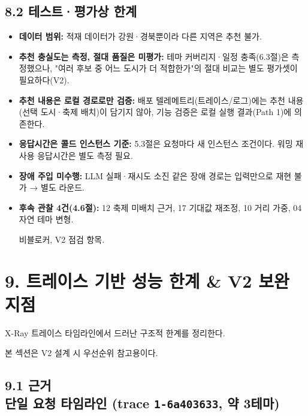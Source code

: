 \documentclass[12pt,a4paper]{article}
\newcommand{\DocNeedspace}[1]{\par\ifdim\dimexpr\pagegoal-\pagetotal\relax<#1\newpage\fi}
\providecommand{\tightlist}{\setlength{\itemsep}{0pt}\setlength{\parskip}{0pt}}
\begin{document}
\DocNeedspace{6\baselineskip}
\subsection*{8.2 테스트·평가상 한계}

\begin{itemize}
\tightlist
\item
  \textbf{데이터 범위:} 적재 데이터가 강원·경북뿐이라 다른 지역은 추천 불가.
\item
  \textbf{추천 충실도는 측정, 절대 품질은 미평가:} 테마 커버리지·일정 충족(6.3절)은 측정했으나, "여러 후보 중 어느 도시가 더 적합한가"의 절대 비교는 별도 평가셋이 필요하다(V2).
\item
  \textbf{추천 내용은 로컬 경로로만 검증:} 배포 텔레메트리(트레이스/로그)에는 추천 내용(선택 도시·축제 배치)이 담기지 않아, 기능 검증은 로컬 실행 결과(Path 1)에 의존한다.
\item
  \textbf{응답시간은 콜드 인스턴스 기준:} 5.3절은 요청마다 새 인스턴스 조건이다.
  워밍 재사용 응답시간은 별도 측정 필요.
\item
  \textbf{장애 주입 미수행:} LLM 실패·재시도 소진 같은 장애 경로는 입력만으로 재현 불가 → 별도 라운드.
\item
  \textbf{후속 관찰 4건(4.6절):} 12 축제 미배치 근거, 17 기대값 재조정, 10 거리 가중, 04 자연 테마 변형.\par\noindent
  비블로커, V2 점검 항목.
\end{itemize}


\newpage
\DocNeedspace{8\baselineskip}
\section*{9. 트레이스 기반 성능 한계 \& V2 보완 지점}

X-Ray 트레이스 타임라인에서 드러난 구조적 한계를 정리한다.
\par\noindent 본 섹션은 V2 설계 시 우선순위 참고용이다.

\DocNeedspace{6\baselineskip}
\subsection*{\texorpdfstring{9.1 근거\\[-0.10em]{\normalsize 단일 요청 타임라인 (trace \texttt{1-\allowbreak{}6a403633}, 약 3테마)}}{9.1 근거 단일 요청 타임라인 (trace 1-6a403633, 약 3테마)}}
\end{document}
